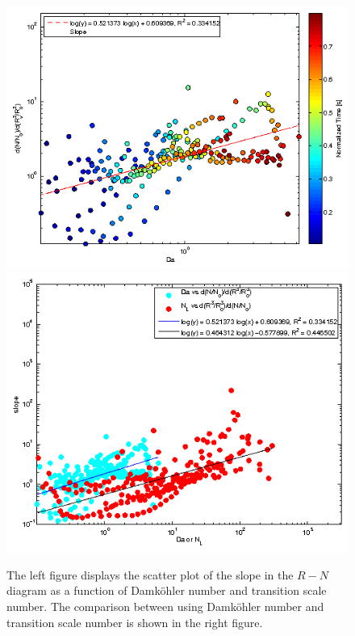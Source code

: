 \documentclass[draft,jgrga]{AGUTeX}
\begin{document}
\begin{article}
\begin{figure}[!htbp]\centering
\includegraphics[width=0.49\linewidth]{Figures/slope_da}
\includegraphics[width=0.49\linewidth]{Figures/slope_da_nl}
\caption{The left figure displays the scatter plot of the slope in the $R-N$ diagram as a function 
of Damk\"{o}hler number and transition scale number. The comparison between using Damk\"{o}hler 
number and transition scale number is shown in the right figure.}
\label{fig:slope_da_nl}
\end{figure}


\end{article}
\end{document}
